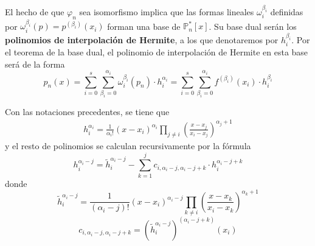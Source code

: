         \begin{obs}
        El hecho de que $\varphi_n$ sea isomorfismo implica que las formas lineales  $\omega_i^{\beta_i}$ definidas por $\omega_i^{\beta_i}(p)=p^{(\beta_i)}(x_i)$ forman una base de $\mathbb{P}_n^*[x]$. Su base dual serán los \textbf{polinomios de interpolación de Hermite}, a los que denotaremos por $h_i^{\beta_i}$. Por el teorema de la base dual, el polinomio de interpolación de Hermite en esta base será de la forma
        $$p_n(x)=\sum_{i=0}^s\sum_{\beta_i=0}^{\alpha_i}\omega_i^{\beta_i}(p_n)\cdot h_i^{\alpha_i}=\sum_{i=0}^s\sum_{\beta_i=0}^{\alpha_i}f^{(\beta_i)}(x_i)\cdot h_i^{\beta_i}$$
        \end{obs}
        \begin{prop}
        Con las notaciones precedentes, se tiene que
        \begin{align}
        h_i^{\alpha_i}=\frac{1}{\alpha_i!}(x-x_i)^{\alpha_i}\prod_{j\neq i}\left(\frac{x-x_j}{x_i-x_j}\right)^{\alpha_j+1}
        \label{pol:herm}
        \end{align}
        y el resto de polinomios se calculan recursivamente por la fórmula
        $$h_i^{\alpha_i-j}=\tilde{h}_i^{\alpha_i-j}-\sum_{k=1}^jc_{i,\alpha_i-j,\alpha_i-j+k}\cdot h_i^{\alpha_i-j+k}$$
        donde
        $$\tilde{h}_i^{\alpha_i-j}=\frac{1}{(\alpha_i-j)!}(x-x_i)^{\alpha_i-j}\prod_{k\neq i}\left(\frac{x-x_k}{x_i-x_k}\right)^{\alpha_k+1}$$
        $$c_{i,\alpha_i-j,\alpha_i-j+k}=(\tilde{h}_i^{\alpha_i-j})^{(\alpha_i-j+k)}(x_i)$$
        \end{prop}
